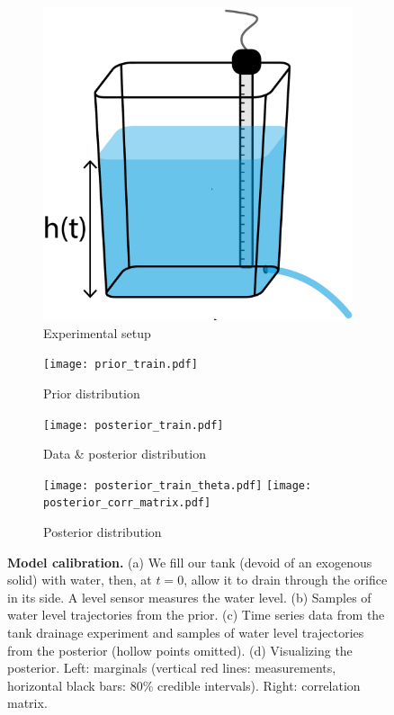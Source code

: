 \documentclass[a4paper,fleqn]{cas-dc}
\begin{document}
\begin{figure}[!ht]
    \centering
        \begin{subfigure}[b]{0.2\textwidth}
    	\includegraphics[width=\textwidth]{naked_tank.pdf}
	\caption{Experimental setup} \label{fig:naked_tank}
    \end{subfigure}
    
     \begin{subfigure}[b]{0.35\textwidth}
    	\texttt{[image: prior\_train.pdf]}
	\caption{Prior distribution} \label{fig:prior_train}
    \end{subfigure}
     \begin{subfigure}[b]{0.35\textwidth}
    	\texttt{[image: posterior\_train.pdf]}
	\caption{Data \& posterior distribution} \label{fig:posterior_train}
    \end{subfigure}
    
     \begin{subfigure}[b]{\textwidth}
     \center
    	\texttt{[image: posterior\_train\_theta.pdf]}
	\texttt{[image: posterior\_corr\_matrix.pdf]}
	\caption{Posterior distribution} \label{fig:posterior_train_theta}
    \end{subfigure}
    \caption{
      \textbf{Model calibration.}
      (a) We fill our tank (devoid of an exogenous solid) with water, then, at $t=0$, allow it to drain through the orifice in its side. A level sensor measures the water level.     
      (b) Samples of water level trajectories from the prior.
      (c) Time series data from the tank drainage experiment and samples of water level trajectories from the posterior (hollow points omitted).
       (d) Visualizing the posterior. Left: marginals (vertical red lines: measurements, horizontal black bars: 80\% credible intervals). Right: correlation matrix.      
      }
\end{figure}
\end{document}
